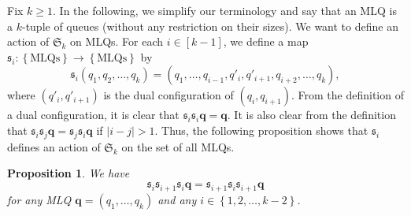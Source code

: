 \documentclass[reqno]{amsart}
\newcommand{\0}{\phantom{c}}
\newcommand{\SymGp}[1]{\mathfrak{S}_{#1}} %
\newcommand{\qq}{\mathbf{q}}
\newcommand{\fraks}{\mathfrak{s}}
\newcommand{\set}[1]{\left\{ #1 \right\}}
\newcommand{\abs}[1]{\left| #1 \right|}
\newcommand{\tup}[1]{\left( #1 \right)}
\newcommand{\ive}[1]{\left[ #1 \right]}
\theoremstyle{plain}
\newtheorem{prop}[thm]{Proposition}
\theoremstyle{definition}
\numberwithin{equation}{section}
\begin{document}
Fix $k \geq 1$.
In the following, we simplify our terminology and say that an MLQ
is a $k$-tuple of queues (without any restriction on their sizes).
We want to define an action of $\SymGp{k}$ on MLQs.
For each $i \in \ive{k-1}$, we define a map $\fraks_i \colon \set{\text{MLQs}} \to \set{\text{MLQs}}$ by
\[
\fraks_i(q_1, q_2, \dotsc, q_k) = (q_1, \dotsc, q_{i-1}, q'_i, q'_{i+1}, q_{i+2}, \dotsc, q_k),
\]
where $\tup{q'_i, q'_{i+1}}$ is the dual configuration of $\tup{q_i, q_{i+1}}$.
From the definition of a dual configuration, it is clear that $\fraks_i \fraks_i \qq = \qq$.
It is also clear from the definition that $\fraks_i \fraks_j \qq = \fraks_j \fraks_i \qq$ if $\abs{i - j} > 1$.
Thus, the following proposition shows that $\fraks_i$ defines an action of $\SymGp{k}$ on the set of all MLQs.

\begin{prop} \label{prop:braid}
We have
\[
\fraks_i \fraks_{i+1} \fraks_i \qq
	   = \fraks_{i+1} \fraks_i \fraks_{i+1} \qq
\]
for any MLQ $\qq = \tup{q_1, \dotsc, q_k}$ and any $i \in \set{1, 2, \ldots, k-2}$.
\end{prop}
\end{document}

